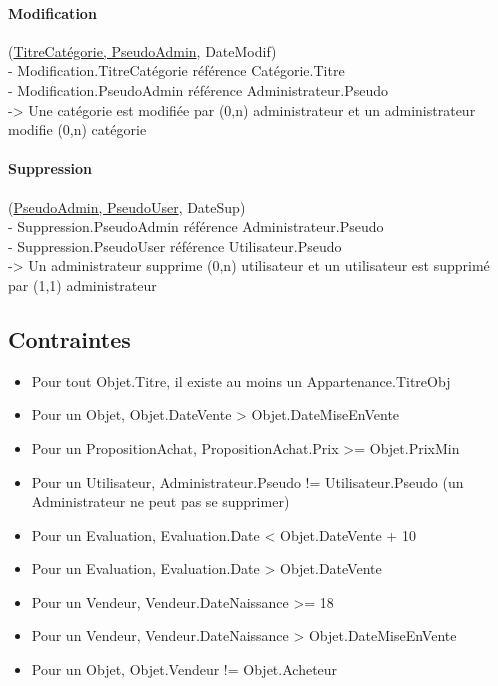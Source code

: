 \documentclass[a4paper,11pt]{article}
\begin{document}
\paragraph{Modification} (\underline{TitreCatégorie, PseudoAdmin}, DateModif)\\
\indent - Modification.TitreCatégorie référence Catégorie.Titre\\
\indent - Modification.PseudoAdmin référence Administrateur.Pseudo\\
\indent \indent -> Une catégorie est modifiée par (0,n) administrateur et un administrateur modifie (0,n) catégorie

\paragraph{Suppression} (\underline{PseudoAdmin, PseudoUser}, DateSup)\\
\indent - Suppression.PseudoAdmin référence Administrateur.Pseudo\\
\indent - Suppression.PseudoUser référence Utilisateur.Pseudo\\
\indent \indent -> Un administrateur supprime (0,n) utilisateur et un utilisateur est supprimé par (1,1) administrateur



\subsection{Contraintes}

\begin{itemize}
    \item Pour tout Objet.Titre, il existe au moins un Appartenance.TitreObj
    \item Pour un Objet, Objet.DateVente > Objet.DateMiseEnVente
    \item Pour un PropositionAchat, PropositionAchat.Prix >= Objet.PrixMin
    \item Pour un Utilisateur, Administrateur.Pseudo != Utilisateur.Pseudo (un Administrateur ne peut pas se supprimer)
    \item Pour un Evaluation, Evaluation.Date < Objet.DateVente + 10
    \item Pour un Evaluation, Evaluation.Date > Objet.DateVente
    \item Pour un Vendeur, Vendeur.DateNaissance >= 18
    \item Pour un Vendeur, Vendeur.DateNaissance > Objet.DateMiseEnVente
    \item Pour un Objet, Objet.Vendeur != Objet.Acheteur
\end{itemize}
\end{document}
